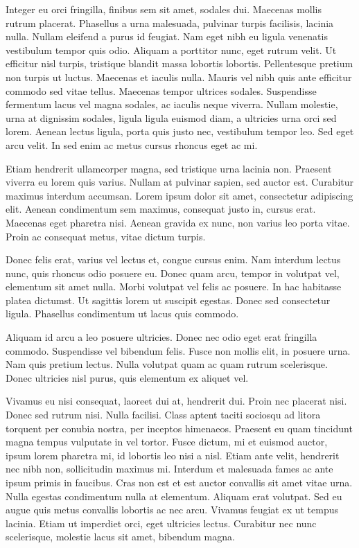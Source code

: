 Integer eu orci fringilla, finibus sem sit amet, sodales dui. Maecenas mollis rutrum placerat. Phasellus a urna malesuada, pulvinar turpis facilisis, lacinia nulla. Nullam eleifend a purus id feugiat. Nam eget nibh eu ligula venenatis vestibulum tempor quis odio. Aliquam a porttitor nunc, eget rutrum velit. Ut efficitur nisl turpis, tristique blandit massa lobortis lobortis. Pellentesque pretium non turpis ut luctus. Maecenas et iaculis nulla. Mauris vel nibh quis ante efficitur commodo sed vitae tellus. Maecenas tempor ultrices sodales. Suspendisse fermentum lacus vel magna sodales, ac iaculis neque viverra. Nullam molestie, urna at dignissim sodales, ligula ligula euismod diam, a ultricies urna orci sed lorem. Aenean lectus ligula, porta quis justo nec, vestibulum tempor leo. Sed eget arcu velit. In sed enim ac metus cursus rhoncus eget ac mi.

Etiam hendrerit ullamcorper magna, sed tristique urna lacinia non. Praesent viverra eu lorem quis varius. Nullam at pulvinar sapien, sed auctor est. Curabitur maximus interdum accumsan. Lorem ipsum dolor sit amet, consectetur adipiscing elit. Aenean condimentum sem maximus, consequat justo in, cursus erat. Maecenas eget pharetra nisi. Aenean gravida ex nunc, non varius leo porta vitae. Proin ac consequat metus, vitae dictum turpis.

Donec felis erat, varius vel lectus et, congue cursus enim. Nam interdum lectus nunc, quis rhoncus odio posuere eu. Donec quam arcu, tempor in volutpat vel, elementum sit amet nulla. Morbi volutpat vel felis ac posuere. In hac habitasse platea dictumst. Ut sagittis lorem ut suscipit egestas. Donec sed consectetur ligula. Phasellus condimentum ut lacus quis commodo.

Aliquam id arcu a leo posuere ultricies. Donec nec odio eget erat fringilla commodo. Suspendisse vel bibendum felis. Fusce non mollis elit, in posuere urna. Nam quis pretium lectus. Nulla volutpat quam ac quam rutrum scelerisque. Donec ultricies nisl purus, quis elementum ex aliquet vel.

Vivamus eu nisi consequat, laoreet dui at, hendrerit dui. Proin nec placerat nisi. Donec sed rutrum nisi. Nulla facilisi. Class aptent taciti sociosqu ad litora torquent per conubia nostra, per inceptos himenaeos. Praesent eu quam tincidunt magna tempus vulputate in vel tortor. Fusce dictum, mi et euismod auctor, ipsum lorem pharetra mi, id lobortis leo nisi a nisl. Etiam ante velit, hendrerit nec nibh non, sollicitudin maximus mi. Interdum et malesuada fames ac ante ipsum primis in faucibus. Cras non est et est auctor convallis sit amet vitae urna. Nulla egestas condimentum nulla at elementum. Aliquam erat volutpat. Sed eu augue quis metus convallis lobortis ac nec arcu. Vivamus feugiat ex ut tempus lacinia. Etiam ut imperdiet orci, eget ultricies lectus. Curabitur nec nunc scelerisque, molestie lacus sit amet, bibendum magna.

